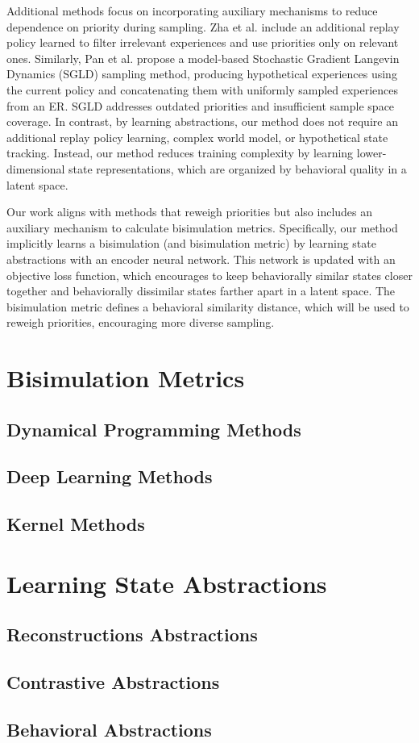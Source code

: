 Additional methods focus on incorporating auxiliary mechanisms to reduce dependence on priority during sampling. Zha et al. \cite{zha2019experience} include an additional replay policy learned to filter irrelevant experiences and use priorities only on relevant ones. Similarly, Pan et al. \cite{pan2022understanding} propose a model-based Stochastic Gradient Langevin Dynamics (SGLD) sampling method, producing hypothetical experiences using the current policy and concatenating them with uniformly sampled experiences from an ER. SGLD addresses outdated priorities and insufficient sample space coverage. In contrast, by learning abstractions, our method does not require an additional replay policy learning, complex world model, or hypothetical state tracking. Instead, our method reduces training complexity by learning lower-dimensional state representations, which are organized by behavioral quality in a latent space.


Our work aligns with methods that reweigh priorities but also includes an auxiliary mechanism to calculate bisimulation metrics. Specifically, our method implicitly learns a bisimulation (and bisimulation metric) by learning state abstractions with an encoder neural network. This network is updated with an objective loss function, which encourages to keep behaviorally similar states closer together and behaviorally dissimilar states farther apart in a latent space. The bisimulation metric defines a behavioral similarity distance, which will be used to reweigh priorities, encouraging more diverse sampling.

\section{Bisimulation Metrics}


\subsection{Dynamical Programming Methods}
\subsection{Deep Learning Methods}
\subsection{Kernel Methods}
\section{Learning State Abstractions}
\subsection{Reconstructions Abstractions}
\subsection{Contrastive Abstractions}
\subsection{Behavioral Abstractions}
